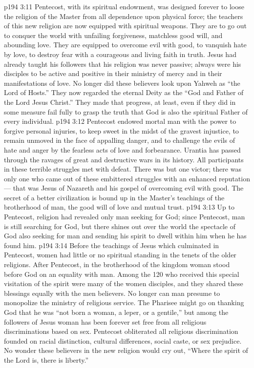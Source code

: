 \vs p194 3:11 \pc Pentecost, with its spiritual endowment, was designed forever to loose the religion of the Master from all dependence upon physical force; the teachers of this new religion are now equipped with spiritual weapons. They are to go out to conquer the world with unfailing forgiveness, matchless good will, and abounding love. They are equipped to overcome evil with good, to vanquish hate by love, to destroy fear with a courageous and living faith in truth. Jesus had already taught his followers that his religion was never passive; always were his disciples to be active and positive in their ministry of mercy and in their manifestations of love. No longer did these believers look upon Yahweh as “the Lord of Hosts.” They now regarded the eternal Deity as the “God and Father of the Lord Jesus Christ.” They made that progress, at least, even if they did in some measure fail fully to grasp the truth that God is also the spiritual Father of every individual.
\vs p194 3:12 Pentecost endowed mortal man with the power to forgive personal injuries, to keep sweet in the midst of the gravest injustice, to remain unmoved in the face of appalling danger, and to challenge the evils of hate and anger by the fearless acts of love and forbearance. Urantia has passed through the ravages of great and destructive wars in its history. All participants in these terrible struggles met with defeat. There was but one victor; there was only one who came out of these embittered struggles with an enhanced reputation --- that was Jesus of Nazareth and his gospel of overcoming evil with good. The secret of a better civilization is bound up in the Master’s teachings of the brotherhood of man, the good will of love and mutual trust.
\vs p194 3:13 Up to Pentecost, religion had revealed only man seeking for God; since Pentecost, man is still searching for God, but there shines out over the world the spectacle of God also seeking for man and sending his spirit to dwell within him when he has found him.
\vs p194 3:14 \pc Before the teachings of Jesus which culminated in Pentecost, women had little or no spiritual standing in the tenets of the older religions. After Pentecost, in the brotherhood of the kingdom woman stood before God on an equality with man. Among the 120 who received this special visitation of the spirit were many of the women disciples, and they shared these blessings equally with the men believers. No longer can man presume to monopolize the ministry of religious service. The Pharisee might go on thanking God that he was “not born a woman, a leper, or a gentile,” but among the followers of Jesus woman has been forever set free from all religious discriminations based on sex. Pentecost obliterated all religious discrimination founded on racial distinction, cultural differences, social caste, or sex prejudice. No wonder these believers in the new religion would cry out, “Where the spirit of the Lord is, there is liberty.”
